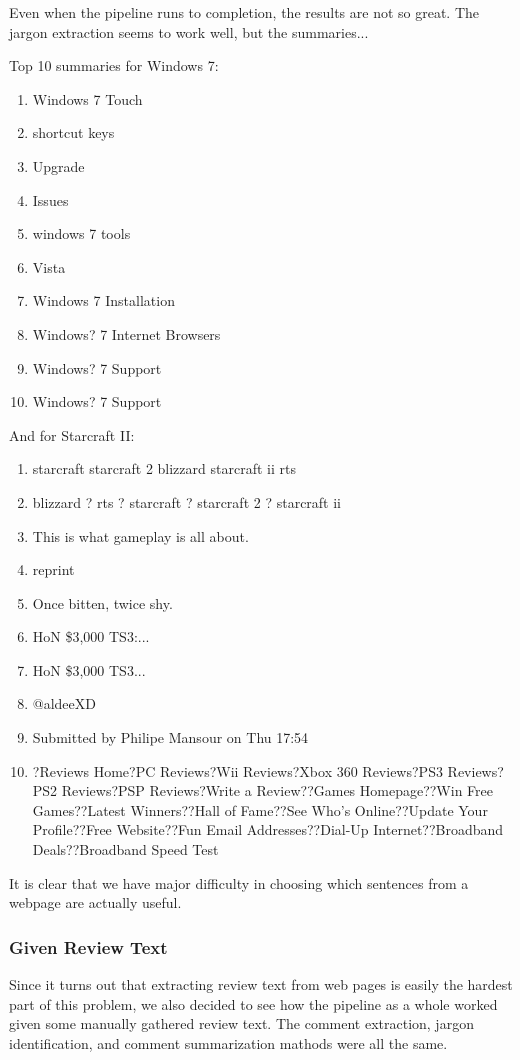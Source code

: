 \documentclass{article}
\begin{document}
Even when the pipeline runs to completion, the results are not so great.
The jargon extraction seems to work well, but the summaries...

Top 10 summaries for Windows 7:
\begin{enumerate}
\item Windows 7 Touch
\item shortcut keys
\item Upgrade
\item Issues
\item windows 7 tools
\item Vista
\item Windows 7 Installation
\item Windows? 7 Internet Browsers
\item Windows? 7 Support
\item Windows? 7 Support
\end{enumerate}

And for Starcraft II:
\begin{enumerate}
\item starcraft
  starcraft 2
  blizzard
  starcraft ii
  rts
\item blizzard ? rts ? starcraft ? starcraft 2 ? starcraft ii
\item This is what gameplay is all about.
\item reprint
\item Once bitten, twice shy.
\item HoN \$3,000 TS3:...
\item HoN \$3,000 TS3...
\item @aldeeXD
\item Submitted by Philipe Mansour on Thu 17:54
\item?Reviews Home?PC Reviews?Wii Reviews?Xbox 360 Reviews?PS3 Reviews?PS2 Reviews?PSP Reviews?Write a Review??Games Homepage??Win Free Games??Latest Winners??Hall of Fame??See Who's Online??Update Your Profile??Free Website??Fun Email Addresses??Dial-Up Internet??Broadband Deals??Broadband Speed Test
\end{enumerate}

It is clear that we have major difficulty in choosing which sentences from a
webpage are actually useful.

\subsubsection{Given Review Text}

Since it turns out that extracting review text from web pages is easily the
hardest part of this problem, we also decided to see how the pipeline as a whole
worked given some manually gathered review text. The comment extraction,
jargon identification, and comment summarization mathods were all the same.
\end{document}
